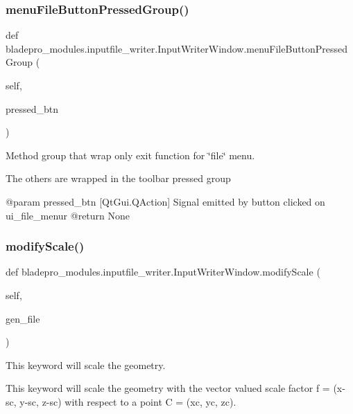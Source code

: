 \subsubsection{\texorpdfstring{menu\+File\+Button\+Pressed\+Group()}{menuFileButtonPressedGroup()}}
{\footnotesize\ttfamily def bladepro\+\_\+modules.\+inputfile\+\_\+writer.\+Input\+Writer\+Window.\+menu\+File\+Button\+Pressed\+Group (\begin{DoxyParamCaption}\item[{}]{self,  }\item[{}]{pressed\+\_\+btn }\end{DoxyParamCaption})}



Method group that wrap only exit function for \char`\"{}file\char`\"{} menu. 

The others are wrapped in the toolbar pressed group \begin{DoxyVerb}   @param pressed_btn [QtGui.QAction] Signal emitted by button clicked on ui_file_menur
   @return None\end{DoxyVerb}
 \hypertarget{a00071_aa1bef88b3d57a567e44548155e7ec02f}{}\label{a00071_aa1bef88b3d57a567e44548155e7ec02f} 
\subsubsection{\texorpdfstring{modify\+Scale()}{modifyScale()}}
{\footnotesize\ttfamily def bladepro\+\_\+modules.\+inputfile\+\_\+writer.\+Input\+Writer\+Window.\+modify\+Scale (\begin{DoxyParamCaption}\item[{}]{self,  }\item[{}]{gen\+\_\+file }\end{DoxyParamCaption})}



This keyword will scale the geometry. 

This keyword will scale the geometry with the vector valued scale factor f = (x-\/sc, y-\/sc, z-\/sc) with respect to a point C = (xc, yc, zc).


